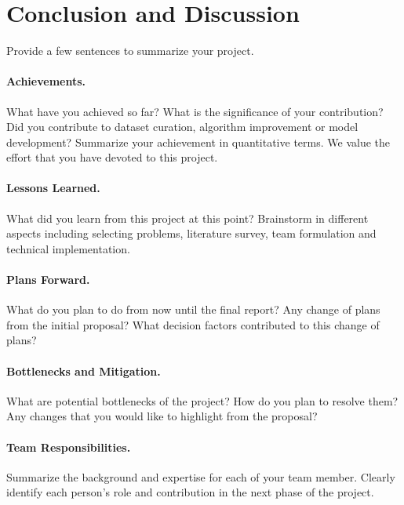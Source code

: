 \documentclass{article}
\newcommand{\new}[1]{{\color{red} #1}}
\begin{document}
\new{
\section{Conclusion and Discussion}
Provide a few sentences to summarize your project. 
\paragraph{Achievements.}
What have you achieved so far? What is the significance of your contribution? Did you contribute to dataset curation, algorithm improvement or model development?  Summarize your achievement in quantitative terms. We value the effort that you have devoted to this project.



\paragraph{Lessons Learned.}
What did you learn from this project at this point?   Brainstorm in different aspects including selecting problems, literature survey, team formulation and technical implementation. 


\paragraph{Plans Forward.}
What do you plan to do from now until the final report? Any change of plans from the initial proposal? What decision factors contributed to this change of plans?

\paragraph{Bottlenecks and Mitigation.}
What are potential bottlenecks of the project? How do you plan to resolve them?  Any changes that you would like to highlight from the proposal?
}


\paragraph{Team Responsibilities.}
Summarize the background and expertise for each of your team member. Clearly identify each person's role and contribution in the next phase of the project.
\end{document}
